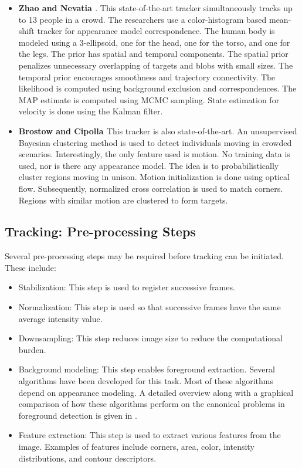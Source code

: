 \documentclass[12pt,letterpaper,doublespaced,ETD,proposal]{gt-ece-thesis}
\begin{document}
\begin{Body}
\begin{itemize}
\item \textbf{Zhao and Nevatia \cite{2004_CNF_TrackingPeople_Zhao}}.  This state-of-the-art tracker simultaneously tracks up to 13 people in a crowd.  The researchers use a color-histogram based mean-shift tracker for appearance model correspondence.  The human body is modeled using a 3-ellipsoid, one for the head, one for the torso, and one for the legs.  The prior has spatial and temporal components.  The spatial prior penalizes unnecessary overlapping of targets and blobs with small sizes.  The temporal prior encourages smoothness and trajectory connectivity.  The likelihood is computed using background exclusion and correspondences.  The MAP estimate is computed using MCMC sampling.  State estimation for velocity is done using the Kalman filter.

\item \textbf{Brostow and Cipolla \cite{2006_CNF_TRKhuman_Brostow}}  This tracker is also state-of-the-art.  An unsupervised Bayesian clustering method is used to detect individuals moving in crowded scenarios.  Interestingly, the only feature used is motion.  No training data is used, nor is there any appearance model.  The idea is to probabilistically cluster regions moving in unison.  Motion initialization is done using optical flow.  Subsequently, normalized cross correlation is used to match corners.  Regions with similar motion are clustered to form targets.
\end{itemize}



\subsection{Tracking: Pre-processing Steps}
Several pre-processing steps may be required before tracking can be initiated.  These include: 

\begin{itemize}
\item Stabilization:  This step is used to register successive frames.
\item Normalization:  This step is used so that successive frames have the same average intensity value.
\item Downsampling: This step reduces image size to reduce the computational burden.
\item Background modeling: This step enables foreground extraction.  Several algorithms have been developed for this task.  Most of these algorithms depend on appearance modeling.  A detailed overview along with a graphical comparison of how these algorithms perform on the canonical problems in foreground detection is given in \cite{1999_CNF_Wallflower_Toyama}.
\item Feature extraction: This step is used to extract various features from the image.  Examples of features include corners, area, color, intensity distributions, and contour descriptors.
\end{itemize}


\end{Body}
\end{document}
